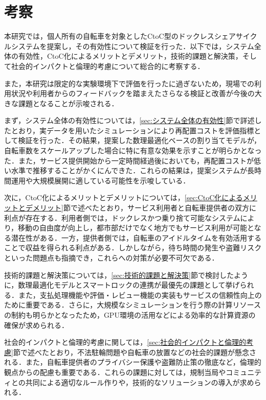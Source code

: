 \clearpage
\newpage

\section{考察}
  \label{sec:考察}
    \par 本研究では，個人所有の自転車を対象としたCtoC型のドックレスシェアサイクルシステムを提案し，その有効性について検証を行った．以下では，システム全体の有効性，CtoC化によるメリットとデメリット，技術的課題と解決策，そして社会的インパクトと倫理的考慮について総合的に考察する．
    \par また，本研究は限定的な実験環境下で評価を行ったに過ぎないため，現場での利用状況や利用者からのフィードバックを踏まえたさらなる検証と改善が今後の大きな課題となることが示唆される．
    \par まず，システム全体の有効性については，\ref{sec:システム全体の有効性}節で詳述したとおり，実データを用いたシミュレーションにより再配置コストを評価指標として検証を行った．その結果，提案した数理最適化ベースの割り当てモデルが，自転車数をスケールアップした場合に特に有意な効果を示すことが明らかとなった．また，サービス提供開始から一定時間経過後においても，再配置コストが低い水準で推移することがかくにんできた．これらの結果は，提案システムが長時間運用や大規模展開に適している可能性を示唆している．
    \par 次に，CtoC化によるメリットとデメリットについては，\ref{sec:CtoC化によるメリットとデメリット}節で述べたとおり，サービス利用者と自転車提供者の双方に利点が存在する．利用者側では，ドックレスかつ乗り捨て可能なシステムにより，移動の自由度が向上し，都市部だけでなく地方でもサービス利用が可能となる潜在性がある．一方，提供者側では，自転車のアイドルタイムを有効活用することで収益を得られる利点がある．しかしながら，待ち時間の発生や盗難リスクといった問題点も指摘でき，これらへの対策が必要不可欠である．
    \par 技術的課題と解決策については，\ref{sec:技術的課題と解決策}節で検討したように，数理最適化モデルとスマートロックの連携が最優先の課題として挙げられる．また，支払処理機能や評価・レビュー機能の実装もサービスの信頼性向上のために重要である．さらに，大規模なシミュレーションを行う際の計算リソースの制約も明らかとなったため，GPU環境の活用などによる効率的な計算資源の確保が求められる．
    \par 社会的インパクトと倫理的考慮に関しては，\ref{sec:社会的インパクトと倫理的考慮}節で述べたとおり，不法駐輪問題や自転車の放置などの社会的課題が懸念される．また，自転車提供者のプライバシー保護や盗難防止策の徹底など，倫理的観点からの配慮も重要である．これらの課題に対しては，規制当局やコミュニティとの共同による適切なルール作りや，技術的なソリューションの導入が求められる．
